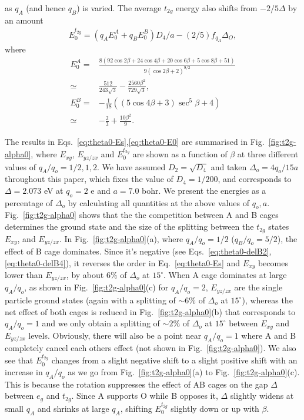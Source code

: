 \documentclass[a4paper,prb,twocolumn]{revtex4-1}  %
\newcommand{\rev}[1]{{\color{blue}{#1}}}
\begin{document}
  as $q_A$ (and hence $q_B$)
  is varied.
The average $t_{2g}$ energy
 also shifts from
$-2/5\Delta$ by an amount
\begin{align}
\label{eq:theta0-E0}
E_{0}^{t_{2g}} = \left(q_A E_{0}^A + q_BE_{0}^B\right)D_4/a
-(2/5)f_{q_A}\Delta_{O},
 \end{align}
 where
\begin{align}
\nonumber
E_{0}^A =&
 \frac{8 (92 \cos 2\beta+24 \cos 4\beta+20 \cos 6\beta+5 \cos 8\beta+51)}{9 (\cos 2\beta+2)^{9/2}}\\
 \simeq& \frac{512}{243 \sqrt{3}}-\frac{2560 \beta ^2}{729 \sqrt{3}},\\
 \nonumber
E_{0}^B=&
 -\frac{1}{18} \left((5 \cos 4\beta+3) \sec ^5\beta+4\right)\\
 \simeq& -\frac{2}{3}+\frac{10 \beta ^2}{9}.
 \end{align}
 
The results in Eqs.~\ref{eq:theta0-Es},\ref{eq:theta0-E0}
are summarised in Fig.~\ref{fig:t2g-alpha0},
where $E_{xy}$, $E_{yz/zx}$ and $E_0^{t_{2g}}$ are shown
as a function of $\beta$
at three different values of $q_A/q_o=1/2,1,2$.
We have 
assumed $D_2=\sqrt{D_4}$ and
taken $\Delta_o=4q_o/15a$ throughout this paper,
which fixes the value of $D_4=1/200$, 
and corresponds to $\Delta= 2.073$ eV at 
$q_o=2$ e and $a=7.0$ bohr.
We present the energies as a percentage of $\Delta_o$
by calculating all quantities at the above values of $q_o,a$.
Fig.~\ref{fig:t2g-alpha0} shows that
the the competition between A and B cages
determines the ground state and the size of the splitting between the 
$t_{2g}$ states
$E_{xy}$, and $E_{yz/zx}$.
In Fig.~\ref{fig:t2g-alpha0}(a),
where $q_A/q_o=1/2$ ($q_B/q_o=5/2$),
the effect of B cage dominates.
Since it's negative (see Eqs.~\ref{eq:theta0-delB2},\ref{eq:theta0-delB4}),
it reverses the order in Eq.~\ref{eq:theta0-Es}
and $E_{xy}$ becomes lower than $E_{yz/zx}$, by about $6\%$ of $\Delta_o$ at $15^\circ$.
When A cage dominates at large $q_A/q_o$,
as shown in Fig.~\ref{fig:t2g-alpha0}(c) for $q_A/q_o=2$,
$E_{yz/zx}$ are the single particle ground states (again with a splitting of $\sim6\%$ of $\Delta_o$ at $15^\circ$),
whereas the net effect of both cages
is reduced in Fig.~\ref{fig:t2g-alpha0}(b)
that corresponds to $q_A/q_o=1$
and we only obtain a splitting of $\sim2\%$ of $\Delta_o$ at $15^\circ$
between $E_{xy}$ and $E_{yz/zx}$ levels.
Obviously, there will also be a point near 
$q_A/q_o=1$ where A and B completely 
cancel each others effect (not shown in Fig.~\ref{fig:t2g-alpha0}).
We also see that $E_0^{t_{2g}}$ changes from a slight negative shift to a slight positive shift
with an increase in $q_A/q_o$ as we
go from Fig.~\ref{fig:t2g-alpha0}(a)
to Fig.~\ref{fig:t2g-alpha0}(c).
This is because the rotation suppresses the
effect of AB cages on the
gap $\Delta$ between $e_{g}$ and $t_{2g}$.
Since A supports O while B opposes it,
$\Delta$ slightly widens at small $q_A$ and shrinks at large $q_A$,
shifting $E_0^{t_{2g}}$ slightly down or up with $\beta$.
\end{document}
